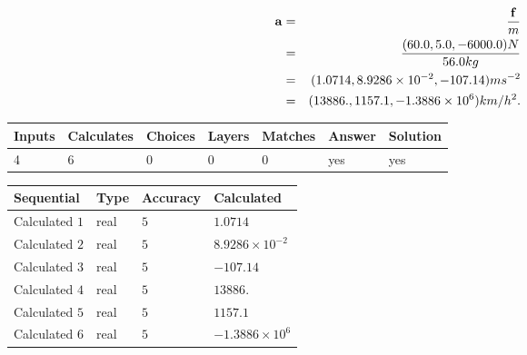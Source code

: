 \documentclass[12pt]{article}
\begin{document}
\begin{eqnarray*}
\mathbf{a}&=&\frac{\mathbf{f}}m  \\
&=&\frac{(
60.0 ,
5.0 ,
-6000.0 )N
}{ %
56.0 kg}  \\
&=&(
1.0714 ,
8.9286 \times 10^{-2},
-107.14
)ms^{-2} \\
&=&(
13886. ,
1157.1 ,
-1.3886 \times 10^{6}
)km/h^2.
\end{eqnarray*}
 
 
 
\noindent{}
 
 

 
\vspace{0.3in}
   
   
   
   
\noindent\begin{tabular}{|l|l|l|l|l|l|l|}
 \hline
Inputs & Calculates & Choices & Layers & Matches & Answer & Solution \\ \hline
           4  & 
           6  & 
           0
  & 
           0  & 
           0  & 
  yes & 
  yes 
  \\ \hline
 \end{tabular}
   
   
   
   
\noindent{}
   
   
  
  
\noindent\begin{tabular}{|l|l|l|l|}
\hline
 Sequential & Type & Accuracy & Calculated \\ 
\hline
 
 
  Calculated $            1 $ & real & $            5  $ & 
 $ 1.0714 $ 
 \\  \hline  
 
 
  Calculated $            2 $ & real & $            5  $ & 
 $ 8.9286 \times 10^{-2} $ 
 \\  \hline  
 
 
  Calculated $            3 $ & real & $            5  $ & 
 $ -107.14 $ 
 \\  \hline  
 
 
  Calculated $            4 $ & real & $            5  $ & 
 $ 13886. $ 
 \\  \hline  
 
 
  Calculated $            5 $ & real & $            5  $ & 
 $ 1157.1 $ 
 \\  \hline  
 
 
  Calculated $            6 $ & real & $            5  $ & 
 $ -1.3886 \times 10^{6} $ 
 \\  \hline  
 \end{tabular}
   
\end{document}
